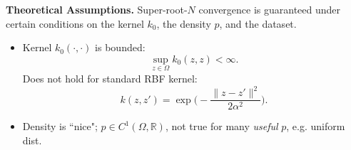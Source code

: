 \documentclass[9pt]{beamer}
\begin{document}
\begin{frame}
\small
\textbf{Theoretical Assumptions.} 
Super-root-$N$ convergence is guaranteed under certain conditions on the kernel $k_0$, the density $p$, and the dataset. 
\begin{itemize}
    \item Kernel $k_0(\cdot, \cdot)$ is bounded: $$\sup_{z \in \Omega} k_0(z, z) < \infty.$$
    Does not hold for standard RBF kernel:
    \[
        k(z, z') = \exp\Big(-\frac{\|z - z'\|^2}{2\alpha^2}\Big).
    \]
    \item Density is ``nice"; $p \in C^1(\Omega, \mathbb{R})$, not true for many \textit{useful} $p$, e.g. uniform dist.
\end{itemize}
\end{frame}







\end{document}
